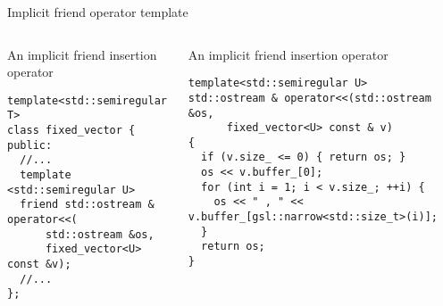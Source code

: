 \begin{frame}[t,fragile]{Implicit friend operator template}
\begin{columns}[T]

\begin{block}{An implicit friend insertion operator}
\begin{lstlisting}
template<std::semiregular T>
class fixed_vector {
public:
  //...
  template <std::semiregular U>
  friend std::ostream & operator<<(
      std::ostream &os, 
      fixed_vector<U> const &v);
  //...
};  
\end{lstlisting}
\end{block}

\begin{block}{An implicit friend insertion operator}
\begin{lstlisting}
template<std::semiregular U>
std::ostream & operator<<(std::ostream &os, 
      fixed_vector<U> const & v) 
{
  if (v.size_ <= 0) { return os; }
  os << v.buffer_[0];
  for (int i = 1; i < v.size_; ++i) {
    os << " , " << v.buffer_[gsl::narrow<std::size_t>(i)];
  }
  return os;
}
\end{lstlisting}
\end{block}

\end{columns}

\end{frame}

